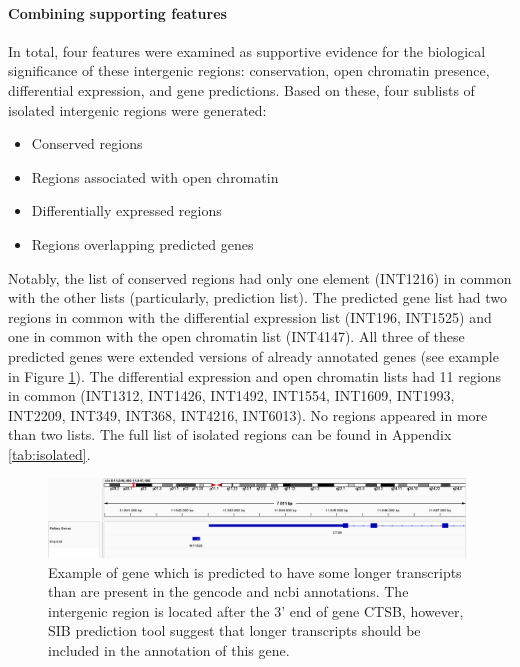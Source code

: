 \paragraph{Combining supporting features}

In total, four features were examined as supportive evidence for the biological significance of these intergenic regions:
conservation, open chromatin presence, differential expression, and gene predictions.
Based on these, four sublists of isolated intergenic regions were generated:

\begin{itemize}
  \item Conserved regions
  \item Regions associated with open chromatin
  \item Differentially expressed regions
  \item Regions overlapping predicted genes
\end{itemize}

Notably, the list of conserved regions had only one element (INT1216) in common with the other lists (particularly, prediction list).
The predicted gene list had two regions in common with the differential expression list (INT196, INT1525)
and one in common with the open chromatin list (INT4147).
All three of these predicted genes were extended versions of already annotated genes (see example in Figure \ref{fig:predictedExtension}).
The differential expression and open chromatin lists had 11 regions in common
(INT1312, INT1426, INT1492, INT1554, INT1609, INT1993, INT2209, INT349, INT368, INT4216, INT6013).
No regions appeared in more than two lists.
The full list of isolated regions can be found in Appendix \ref{tab:isolated}.

\begin{figure}
  \centering
  \includegraphics[width=\linewidth]{images/igv/INT1525.png}
  \caption{Example of gene which is predicted to have some longer transcripts than are present in the gencode and ncbi annotations.
  The intergenic region is located after the 3' end of gene CTSB, however,
  SIB prediction tool suggest that longer transcripts should be included in the annotation of this gene.}
  \label{fig:predictedExtension}
\end{figure}

